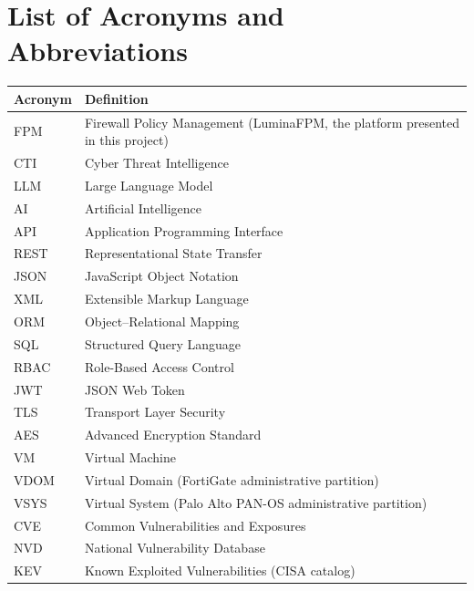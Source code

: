 \documentclass[12pt,a4paper]{report}
\renewcommand{\_}{\textunderscore\allowbreak}
\newcommand{\hcell}[1]{\textbf{#1}}
\begin{document}
%
\clearpage

\tableofcontents
\clearpage
\listoffigures
{}
\clearpage
\listoftables
{}
\clearpage

\chapter*{List of Acronyms and Abbreviations}
\begin{center}
\footnotesize
\setlength{\arrayrulewidth}{0.4pt}
\begin{longtable}{|L{2.8cm}|L{11.6cm}|}
\hline
%
\hcell{Acronym} & \hcell{Definition} \\ \hline
\endhead
FPM & Firewall Policy Management (LuminaFPM, the platform presented in this project) \\ \hline
CTI & Cyber Threat Intelligence \\ \hline
LLM & Large Language Model \\ \hline
AI & Artificial Intelligence \\ \hline
API & Application Programming Interface \\ \hline
REST & Representational State Transfer \\ \hline
JSON & JavaScript Object Notation \\ \hline
XML & Extensible Markup Language \\ \hline
ORM & Object--Relational Mapping \\ \hline
SQL & Structured Query Language \\ \hline
RBAC & Role-Based Access Control \\ \hline
JWT & JSON Web Token \\ \hline
TLS & Transport Layer Security \\ \hline
AES & Advanced Encryption Standard \\ \hline
VM & Virtual Machine \\ \hline
VDOM & Virtual Domain (FortiGate administrative partition) \\ \hline
VSYS & Virtual System (Palo Alto PAN-OS administrative partition) \\ \hline
CVE & Common Vulnerabilities and Exposures \\ \hline
NVD & National Vulnerability Database \\ \hline
KEV & Known Exploited Vulnerabilities (CISA catalog) \\ \hline

\end{longtable}
\end{center}
\end{document}
